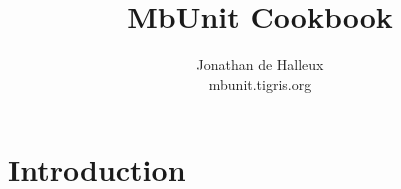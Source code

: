 \documentclass[10pt]{testfu}
\title{MbUnit Cookbook}
\author{Jonathan de Halleux\\
mbunit.tigris.org}
\begin{document}
\initreport

\chapter{Introduction}

\begin{cs}

\end{cs}
\end{document}
